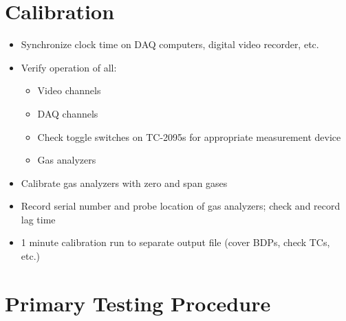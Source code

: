 \documentclass[11pt,oneside]{book}
\begin{document}
\section{Calibration}

\begin{itemize}
\item Synchronize clock time on DAQ computers, digital video recorder, etc.

\item Verify operation of all:
    \begin{itemize}
    \item Video channels
    \item DAQ channels
    \item Check toggle switches on TC-2095s for appropriate measurement device
    \item Gas analyzers
    \end{itemize}

\item Calibrate gas analyzers with zero and span gases

\item Record serial number and probe location of gas analyzers; check and record lag time

\item 1 minute calibration run to separate output file (cover BDPs, check TCs, etc.)

\end{itemize}

\section{Primary Testing Procedure}
\end{document}

